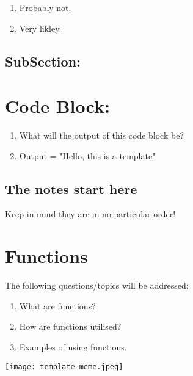 \documentclass[
	12pt, %
]{fphw}
\begin{document}
\begin{enumerate} %
	\item Probably not.
    
	\item Very likley.
\end{enumerate}


\subsection*{SubSection:} 


\section*{Code Block:}

\begin{problem}
	
	
	\begin{enumerate}
		\item What will the output of this code block be?
		\item Output = "Hello, this is a template"
	\end{enumerate}

\end{problem}
\clearpage
\subsection*{The notes start here}
Keep in mind they are in no particular order!


\section{Functions}

\begin{problem}
	The following questions/topics will be addressed:
	\begin{enumerate}
		\item What are functions?
		\item How are functions utilised?
		\item Examples of using functions.
	\end{enumerate}
\end{problem}
\begin{center}
	\texttt{[image: template-meme.jpeg]} %
\end{center}
\end{document}
